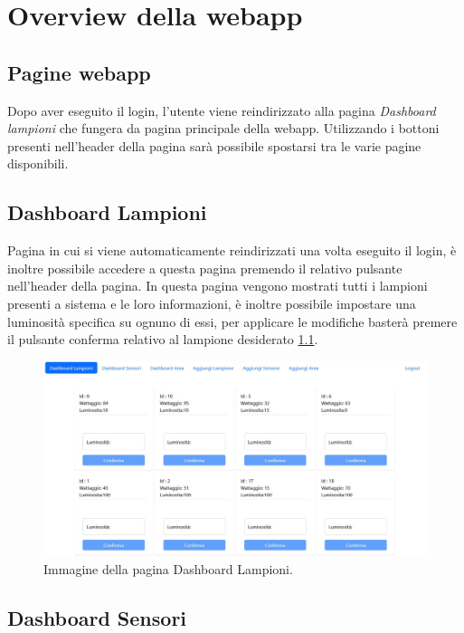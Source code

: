 \chapter{Overview della webapp}

\section{Pagine webapp}

Dopo aver eseguito il login, l'utente viene reindirizzato alla pagina \textit{Dashboard lampioni} che fungera da pagina principale della webapp. Utilizzando i bottoni presenti nell'header della pagina sarà possibile spostarsi tra le varie pagine disponibili.

\section{Dashboard Lampioni}

Pagina in cui si viene automaticamente reindirizzati una volta eseguito il login, è inoltre possibile accedere a questa pagina premendo il relativo pulsante nell'header della pagina. In questa pagina vengono mostrati tutti i lampioni presenti a sistema e le loro informazioni, è inoltre possibile impostare una luminosità specifica su ognuno di essi, per applicare le modifiche basterà premere il pulsante conferma relativo al lampione desiderato \ref{fig:lista_lampioni}.

\begin{figure}[ht]
    \centering
    \includegraphics[width=\textwidth]{img/lista_lampioni.jpeg}
    \caption{Immagine della pagina Dashboard Lampioni.}
    \label{fig:lista_lampioni}
\end{figure}

\section{Dashboard Sensori}

